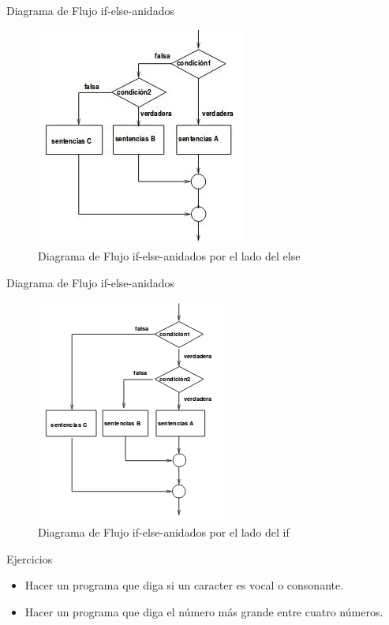 \begin{frame}{Diagrama de Flujo if-else-anidados}

\begin{figure}[htbp]
\centering
\includegraphics{if-else-anidados.jpg}
\caption{Diagrama de Flujo if-else-anidados por el lado del else}
\end{figure}

\end{frame}

\begin{frame}{Diagrama de Flujo if-else-anidados}

\begin{figure}[htbp]
\centering
\includegraphics{if-else-anidados-2.jpg}
\caption{Diagrama de Flujo if-else-anidados por el lado del if}
\end{figure}

\end{frame}

\begin{frame}{Ejercicios}

\begin{itemize}
\item
  Hacer un programa que diga si un caracter es vocal o consonante.
\item
  Hacer un programa que diga el número más grande entre cuatro números.
\end{itemize}

\end{frame}

